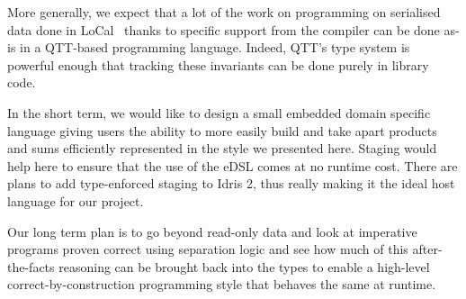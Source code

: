 More generally, we expect that a lot of the work on programming on serialised
data done in LoCal~\cite{DBLP:conf/pldi/VollmerKRS0N19} thanks to specific support
from the compiler can be done as-is in a QTT-based programming language.
%
Indeed, QTT's type system is powerful enough that tracking these invariants can
be done purely in library code.

In the short term, we would like to design a small embedded domain specific language
giving users the ability to more easily build and take apart products and sums
efficiently represented in the style we presented here.
%
Staging would help here to ensure that the use of the eDSL comes at no runtime cost.
%
There are plans to add type-enforced staging to Idris 2, thus really making it the
ideal host language for our project.

Our long term plan is to go beyond read-only data and look at imperative programs
proven correct using separation logic and see how much of this after-the-facts
reasoning can be brought back into the types to enable a high-level
correct-by-construction programming style that behaves the same at runtime.
